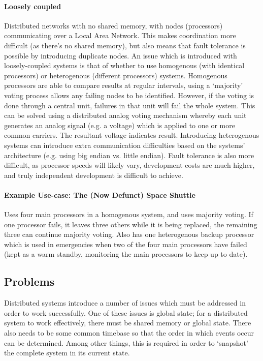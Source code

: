 \documentclass[a4paper,oneside]{report}
\begin{document}
    	\paragraph{Loosely coupled} Distributed networks with no shared memory, with nodes (processors) communicating over a Local Area Network. This makes coordination more difficult (as there's no shared memory), but also means that fault tolerance is possible by introducing duplicate nodes. An issue which is introduced with loosely-coupled systems is that of whether to use homogenous (with identical processors) or heterogenous (different processors) systems. Homogenous processors are able to compare results at regular intervals, using a `majority' voting process allows any failing nodes to be identified. However, if the voting is done through a central unit, failures in that unit will fail the whole system. This can be solved using a distributed analog voting mechanism whereby each unit generates an analog signal (e.g. a voltage) which is applied to one or more common carriers. The resultant voltage indicates result. Introducing heterogenous systems can introduce extra communication difficulties based on the systems' architecture (e.g. using big endian vs. little endian). Fault tolerance is also more difficult, as processor speeds will likely vary, development costs are much higher, and truly independent development is difficult to achieve.
    	
    	\paragraph{Example Use-case: The (Now Defunct) Space Shuttle} 
    	Uses four main processors in a homogenous system, and uses majority voting. If one processor fails, it leaves three others while it is being replaced, the remaining three can continue majority voting. Also has one heterogenous backup processor which is used in emergencies when two of the four main processors have failed (kept as a warm standby, monitoring the main processors to keep up to date).
    	
   	\subsection{Problems}
   	
   	Distributed systems introduce a number of issues which must be addressed in order to work successfully.  One of these issues is global state; for a distributed system to work effectively, there must be shared memory or global state. There also needs to be some common timebase so that the order in which events occur can be determined. Among other things, this is required in order to `snapshot' the complete system in its current state.
   	
\end{document}
